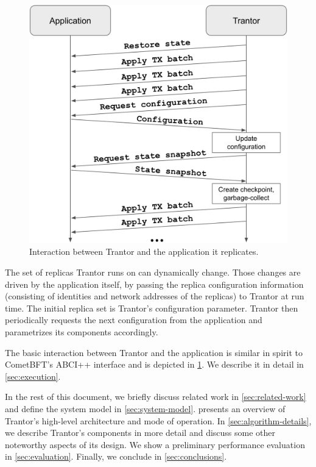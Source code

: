 \documentclass{article}
\begin{document}
\begin{figure}
    \includegraphics[width=\linewidth]{figures/application-interface.jpeg}
    \caption{Interaction between Trantor and the application it replicates.}
    \label{fig:application-interface}
\end{figure}

The set of replicas Trantor runs on can dynamically change.
Those changes are driven by the application itself, by passing the replica configuration information
(consisting of identities and network addresses of the replicas) to Trantor at run time.
The initial replica set is Trantor’s configuration parameter.
Trantor then periodically requests the next configuration from the application and parametrizes its components accordingly.

The basic interaction between Trantor and the application is similar in spirit to CometBFT’s ABCI++ interface \cite{abciplusplus}
and is depicted in \cref{fig:application-interface}.
We describe it in detail in \cref{sec:execution}.

In the rest of this document,
we briefly discuss related work in \cref{sec:related-work} and define the system model in \cref{sec:system-model}.
 presents an overview of Trantor’s high-level architecture and mode of operation.
In \cref{sec:algorithm-details}, we describe Trantor’s components in more detail and discuss some other noteworthy aspects of its design.
We show a preliminary performance evaluation in \cref{sec:evaluation}.
Finally, we conclude in \cref{sec:conclusions}.
\end{document}
